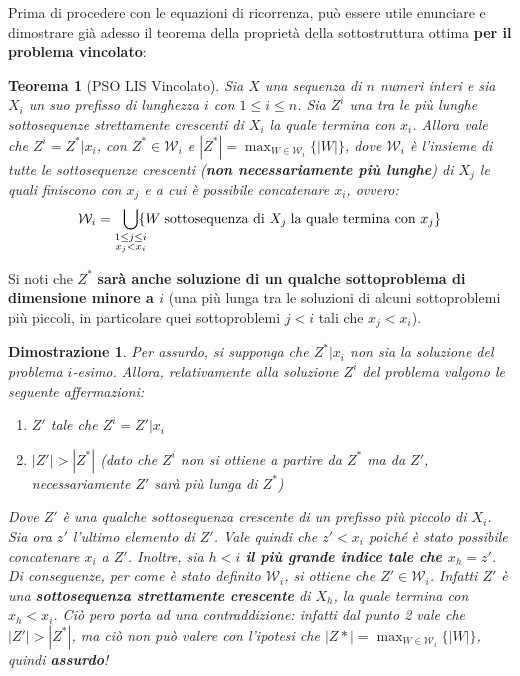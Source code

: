 \documentclass[12pt]{article}
\newtheorem{Teorema}{Teorema}[subsection]
\newtheorem{Dimostrazione}{Dimostrazione}[subsection]
\begin{document}
Prima di procedere con le equazioni di ricorrenza, può essere utile enunciare e dimostrare già adesso il teorema della proprietà della sottostruttura ottima \textbf{per il problema vincolato}:
\begin{Teorema}[PSO LIS Vincolato]
    Sia $X$ una sequenza di $n$ numeri interi e sia $X_i$ un suo prefisso di lunghezza $i$ con $1 \leq i \leq n$. Sia $Z^i$ una tra le più lunghe sottosequenze strettamente crescenti di $X_i$ la quale termina
    con $x_i$. Allora vale che $Z^i = Z^*|x_i$, con $Z^* \in \mathcal{W}_i$ e $|Z^*| = \max_{W \in \mathcal{W}_i}\{|W|\}$, dove $\mathcal{W}_i$ è l'insieme di tutte le sottosequenze crescenti (\textbf{non necessariamente più lunghe}) di $X_j$ le quali finiscono con $x_j$ e a cui è possibile
    concatenare $x_i$, ovvero:
    $$\mathcal{W}_i = \smashoperator[r]{\bigcup_{\substack{1 \leq j \leq i \\ x_j < x_i}}}\{W \; \textrm{sottosequenza di } X_j \; \textrm{la quale termina con } x_j\}$$
\end{Teorema}
Si noti che $Z^*$ \textbf{sarà anche soluzione di un qualche sottoproblema di dimensione minore a $i$} (una più lunga tra le soluzioni di alcuni sottoproblemi più piccoli, in particolare quei sottoproblemi $j < i$ tali che $x_j < x_i$).
\begin{Dimostrazione}
    Per assurdo, si supponga che $Z^*|x_i$ non sia la soluzione del problema $i$-esimo. Allora, relativamente alla soluzione $Z^i$ del problema valgono le seguente affermazioni:
    \begin{enumerate}
        \item $Z'$ tale che $Z^i = Z'|x_i$
        \item $|Z'| > |Z^*|$ (dato che $Z^i$ non si ottiene a partire da $Z^*$ ma da $Z'$, necessariamente $Z'$ sarà più lunga di $Z^*$)
    \end{enumerate}
    Dove $Z'$ è una qualche sottosequenza crescente di un prefisso più piccolo di $X_i$. Sia ora $z'$ l'ultimo elemento di $Z'$. Vale quindi che $z' < x_i$ poiché è stato
    possibile concatenare $x_i$ a $Z'$. Inoltre, sia $h < i$ \textbf{il più grande indice tale che $x_h = z'$}. Di conseguenze, per come è stato definito $\mathcal{W}_i$, si ottiene
    che $Z' \in \mathcal{W}_i$. Infatti $Z'$ è una \textbf{sottosequenza strettamente crescente } di $X_h$, la quale termina con $x_h < x_i$.
    Ciò pero porta ad una contraddizione: infatti dal punto 2 vale che $|Z'| > |Z^*|$, ma ciò non può valere con l'ipotesi che $|Z*| = \max_{W \in \mathcal{W}_i}\{|W|\}$, quindi \textbf{assurdo}!
\end{Dimostrazione}
\end{document}
